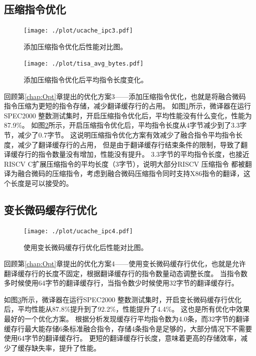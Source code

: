 \subsection{压缩指令优化}

\begin{figure}[!htbp]
  \centering
  \texttt{[image: ./plot/ucache\_ipc3.pdf]}
  \caption{添加压缩指令优化后性能对比图。}
  \label{img:ipc3}
\end{figure}

\begin{figure}[!htbp]
  \centering
  \texttt{[image: ./plot/tisa\_avg\_bytes.pdf]}
  \caption{添加压缩指令优化后平均指令长度变化。}
  \label{img:avg_bytes}
\end{figure}

回顾第\ref{chap:Opt}章提出的优化方案3——添加压缩指令优化，也就是将融合微码指令压缩为更短的指令存储，减少翻译缓存行的占用。
如图\ref{img:ipc3}所示，微译器在运行SPEC2000 整数测试集时，开启压缩指令优化后，平均性能没有什么变化，性能为87.9\%。
如图\ref{img:avg_bytes}所示，开启压缩指令优化后，平均指令长度从4字节减少到了3.3字节，减少了0.7字节。
这说明压缩指令优化方案有效减少了融合指令平均指令长度，减少了翻译缓存行的占用，
但是由于翻译缓存行结束条件的限制，导致了翻译缓存行的指令数量没有增加，性能没有提升。
3.3字节的平均指令长度，也接近RISCV C扩展压缩指令的平均长度（3字节），说明大部分RISCV 压缩指令
都被翻译为融合微码的压缩指令，考虑到融合微码压缩指令同时支持X86指令的翻译，这个长度是可以接受的。

\subsection{变长微码缓存行优化}

\begin{figure}[!htbp]
  \centering
  \texttt{[image: ./plot/ucache\_ipc4.pdf]}
  \caption{使用变长微码缓存行优化后性能对比图。}
  \label{img:ipc4}
\end{figure}

回顾第\ref{chap:Opt}章提出的优化方案4——使用变长微码缓存行优化，也就是允许翻译缓存行的长度不固定，根据翻译缓存行的指令数量动态调整长度。
当指令数多时候使用64字节的翻译缓存行，当指令数少时候使用32字节的翻译缓存行。

如图\ref{img:ipc4}所示，微译器在运行SPEC2000 整数测试集时，开启变长微码缓存行优化后，平均性能从87.8\%提升到了92.2\%，性能提升了4.4\%。
这也是所有优化中效果最好的一个优化方案。
根据分析发现缓存行平均指令数为4.0条，而32字节的翻译缓存行最大能存储6条标准融合指令，存储4条指令是足够的，大部分情况下不需要使用64字节的翻译缓存行。
更短的翻译缓存行长度，意味着更高的存储效率，减少了缓存缺失率，提升了性能。


